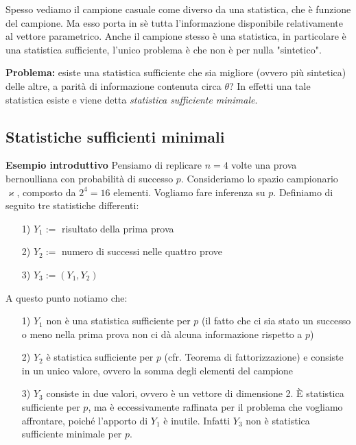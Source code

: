 \begin{oss} Spesso vediamo il campione casuale come diverso da una statistica, che è funzione del campione. Ma esso porta in sè tutta l'informazione disponibile relativamente al vettore parametrico. Anche il campione stesso è una statistica, in particolare è una statistica sufficiente, l'unico problema è che non è per nulla "sintetico".
\end{oss}

\textbf{Problema:} esiste una statistica sufficiente che sia migliore (ovvero più sintetica) delle altre, a parità di informazione contenuta circa $\theta$? In effetti una tale statistica esiste e viene detta \textit{statistica sufficiente minimale}.


\subsection{Statistiche sufficienti minimali}

\textbf{Esempio introduttivo} Pensiamo di replicare $n=4$ volte una prova bernoulliana con probabilità di successo $p$. Consideriamo lo spazio campionario $\varkappa$, composto da $2^4=16$ elementi. Vogliamo fare inferenza su $p$. Definiamo di seguito tre statistiche differenti:

\begin{enumerate}
\item [1)] $Y_1 := $ risultato della prima prova
\item [2)] $Y_2 := $ numero di successi nelle quattro prove
\item [3)] $Y_3 := (Y_1,Y_2)$
\end{enumerate}

A questo punto notiamo che:

\begin{enumerate}
\item [1)] $Y_1$ non è una statistica sufficiente per $p$ (il fatto che ci sia stato un successo o meno nella prima prova non ci dà alcuna informazione rispetto a $p$)
\item [2)] $Y_2$ è statistica sufficiente per $p$ (cfr. Teorema di fattorizzazione) e consiste in un unico valore, ovvero la somma degli elementi del campione
\item [3)] $Y_3$ consiste in due valori, ovvero è un vettore di dimensione 2. È statistica sufficiente per $p$, ma è eccessivamente raffinata per il problema che vogliamo affrontare, poiché l'apporto di $Y_1$ è inutile. Infatti $Y_3$ non è statistica sufficiente minimale per $p$.
\end{enumerate}

